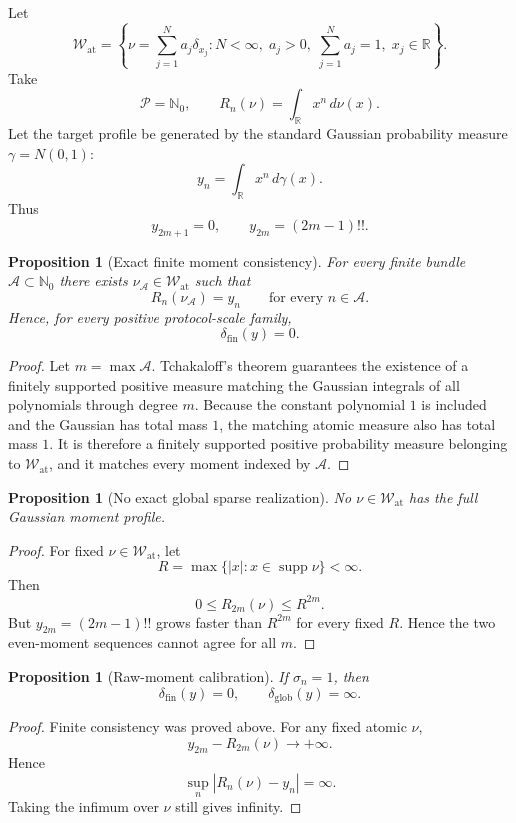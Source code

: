 \documentclass[11pt]{article}
\newtheorem{proposition}[definition]{Proposition}
\newcommand{\W}{\mathcal W}
\newcommand{\Pcal}{\mathcal P}
\newcommand{\Acal}{\mathcal A}
\begin{document}
Let
\[
\W_{\mathrm{at}}
=
\left\{
\nu=\sum_{j=1}^N a_j\delta_{x_j}:
N<\infty,\;
a_j>0,\;
\sum_{j=1}^N a_j=1,\;
x_j\in\mathbb R
\right\}.
\]
Take
\[
\Pcal=\mathbb N_0,
\qquad
R_n(\nu)=\int_{\mathbb R}x^n\,d\nu(x).
\]
Let the target profile be generated by the standard Gaussian probability
measure $\gamma=N(0,1)$:
\[
y_n=\int_{\mathbb R}x^n\,d\gamma(x).
\]
Thus
\[
y_{2m+1}=0,
\qquad
y_{2m}=(2m-1)!!.
\]

\begin{proposition}[Exact finite moment consistency]
For every finite bundle $\Acal\subset\mathbb N_0$ there exists
$\nu_{\Acal}\in\W_{\mathrm{at}}$ such that
\[
R_n(\nu_{\Acal})=y_n
\qquad
\text{for every }n\in\Acal.
\]
Hence, for every positive protocol-scale family,
\[
\delta_{\mathrm{fin}}(y)=0.
\]
\end{proposition}

\begin{proof}
Let $m=\max\Acal$. Tchakaloff's theorem guarantees the existence of a
finitely supported positive measure matching the Gaussian integrals of all
polynomials through degree $m$. Because the constant polynomial $1$ is included
and the Gaussian has total mass $1$, the matching atomic measure also has total
mass $1$. It is therefore a finitely supported positive probability measure
belonging to $\W_{\mathrm{at}}$, and it matches every moment indexed by
$\Acal$.
\end{proof}

\begin{proposition}[No exact global sparse realization]
No $\nu\in\W_{\mathrm{at}}$ has the full Gaussian moment profile.
\end{proposition}

\begin{proof}
For fixed $\nu\in\W_{\mathrm{at}}$, let
\[
R=\max\{|x|:x\in\operatorname{supp}\nu\}<\infty.
\]
Then
\[
0\le R_{2m}(\nu)\le R^{2m}.
\]
But $y_{2m}=(2m-1)!!$ grows faster than $R^{2m}$ for every fixed $R$.
Hence the two even-moment sequences cannot agree for all $m$.
\end{proof}

\begin{proposition}[Raw-moment calibration]
If $\sigma_n=1$, then
\[
\delta_{\mathrm{fin}}(y)=0,
\qquad
\delta_{\mathrm{glob}}(y)=\infty.
\]
\end{proposition}

\begin{proof}
Finite consistency was proved above. For any fixed atomic $\nu$,
\[
y_{2m}-R_{2m}(\nu)\to+\infty.
\]
Hence
\[
\sup_n|R_n(\nu)-y_n|=\infty.
\]
Taking the infimum over $\nu$ still gives infinity.
\end{proof}
\end{document}
